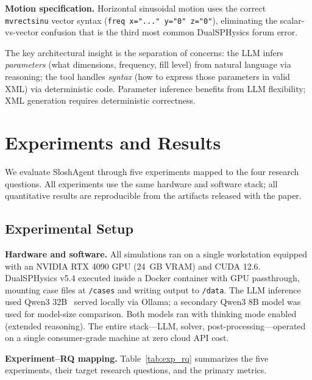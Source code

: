 \documentclass[11pt]{article}
\begin{document}
\textbf{Motion specification.} Horizontal sinusoidal motion uses the correct \texttt{mvrectsinu} vector syntax (\texttt{freq x="..." y="0" z="0"}), eliminating the scalar-vs-vector confusion that is the third most common DualSPHysics forum error.

The key architectural insight is the separation of concerns: the LLM infers \textit{parameters} (what dimensions, frequency, fill level) from natural language via reasoning; the tool handles \textit{syntax} (how to express those parameters in valid XML) via deterministic code. Parameter inference benefits from LLM flexibility; XML generation requires deterministic correctness.

\section{Experiments and Results}

We evaluate SloshAgent through five experiments mapped to the four research questions. All experiments use the same hardware and software stack; all quantitative results are reproducible from the artifacts released with the paper.

\subsection{Experimental Setup}

\textbf{Hardware and software.} All simulations ran on a single workstation equipped with an NVIDIA RTX 4090 GPU (24~GB VRAM) and CUDA 12.6. DualSPHysics v5.4 executed inside a Docker container with GPU passthrough, mounting case files at \texttt{/cases} and writing output to \texttt{/data}. The LLM inference used Qwen3 32B~\citep{qwen2025} served locally via Ollama; a secondary Qwen3 8B model was used for model-size comparison. Both models ran with thinking mode enabled (extended reasoning). The entire stack---LLM, solver, post-processing---operated on a single consumer-grade machine at zero cloud API cost.

\textbf{Experiment--RQ mapping.} Table~\ref{tab:exp_rq} summarizes the five experiments, their target research questions, and the primary metrics.
\end{document}

